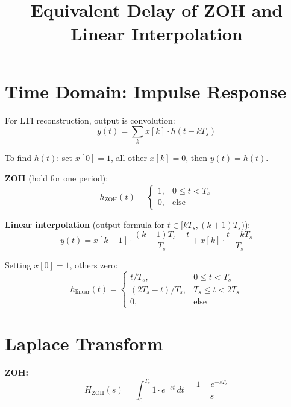 \documentclass[11pt,a4paper]{article}
\title{\textbf{Equivalent Delay of ZOH and Linear Interpolation}}
\author{}
\date{}
\begin{document}
\maketitle

\section{Time Domain: Impulse Response}

For LTI reconstruction, output is convolution:
\begin{equation}
y(t) = \sum_{k} x[k] \cdot h(t - kT_s)
\end{equation}

To find $h(t)$: set $x[0]=1$, all other $x[k]=0$, then $y(t) = h(t)$.

\textbf{ZOH} (hold for one period):
\begin{equation}
h_{\text{ZOH}}(t) = \begin{cases} 1, & 0 \le t < T_s \\ 0, & \text{else} \end{cases}
\end{equation}

\textbf{Linear interpolation} (output formula for $t \in [kT_s, (k+1)T_s)$):
\begin{equation}
y(t) = x[k-1] \cdot \frac{(k+1)T_s - t}{T_s} + x[k] \cdot \frac{t - kT_s}{T_s}
\end{equation}

Setting $x[0]=1$, others zero:
\begin{equation}
h_{\text{linear}}(t) = \begin{cases}
t/T_s, & 0 \le t < T_s \\
(2T_s - t)/T_s, & T_s \le t < 2T_s \\
0, & \text{else}
\end{cases}
\end{equation}

\section{Laplace Transform}

\textbf{ZOH:}
\begin{equation}
H_{\text{ZOH}}(s) = \int_0^{T_s} 1 \cdot e^{-st} \, dt = \frac{1 - e^{-sT_s}}{s}
\end{equation}
\end{document}
